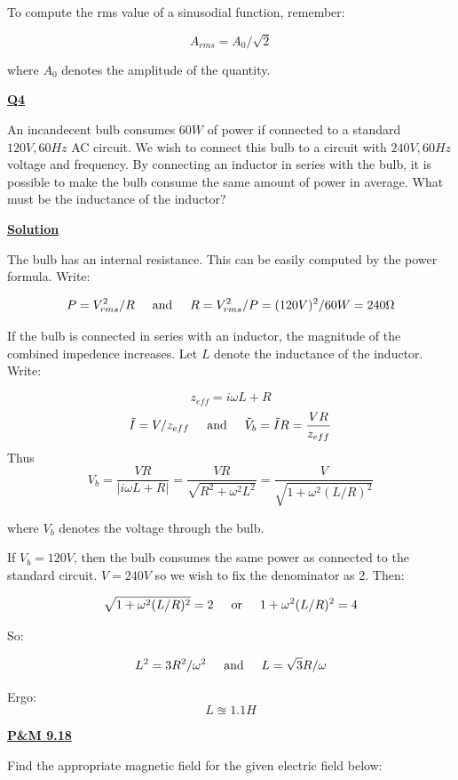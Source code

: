\documentclass{article}
\newcommand{\new}[1]{
    \vspace{2mm}
    \noindent
    \textbf{
    \underline{#1}}
}
\newcommand{\textOr}{
    {
        \hspace{5mm}
        \textrm{or}
        \hspace{5mm}
    }
}
\newcommand{\textAnd}{
    {
        \hspace{5mm}
        \textrm{and}
        \hspace{5mm}
    }
}
\def\Ohm{{\Omega}}
\begin{document}
To compute the rms value of a sinusodial function, remember:

\[
    A_{rms} = A_0/\sqrt{2}
\]

where $A_0$ denotes the amplitude of the quantity. 

\new{Q4}
An incandecent bulb consumes $60W$ of power if connected to 
a standard $120V, 60Hz$ AC circuit. We wish to connect this 
bulb to a circuit with $240V, 60Hz$ voltage and frequency. 
By connecting an inductor in series with the bulb, it is possible 
to make the bulb consume the same amount of power in average. 
What must be the inductance of the inductor?

\new{Solution}
The bulb has an internal resistance. This can be easily computed 
by the power formula. Write:

\[
    P = V_{rms}^2/R 
    \textAnd 
    R = V_{rms}^2/P = (120V)^2/60W = 240\Ohm
\]

If the bulb is connected in series with an inductor, the 
magnitude of the combined impedence increases. Let 
$L$ denote the inductance of the inductor. Write:

\[
    z_{eff} = i\omega L + R
\]
\[
    \tilde{I} = V/z_{eff} \textAnd \tilde{V}_b = \tilde{I}R = \frac{VR}{z_{eff}}
\]
Thus
\[
    V_b = \frac{VR}
    {|i\omega L + R|}
    = 
    \frac{VR}
    {\sqrt{R^2+\omega^2L^2}}
    = 
    \frac{V}
    {\sqrt{1+\omega^2 (L/R)^2}}
\]

where $V_b$ denotes the voltage through the bulb. 

If $V_b = 120V$, then the bulb consumes the same power as 
connected to the standard circuit. $V = 240V$ so we wish 
to fix the denominator as 2. Then:

\[
\sqrt{1+\omega^2 (L/R)^2} = 2
\textOr 
1+\omega^2(L/R)^2 = 4
\]

So:

\[
    L^2 = 3R^2/\omega^2 
    \textAnd 
    L = \sqrt{3}R/\omega
\]

Ergo:
\[
    \boxed{
        L \approxeq 1.1H
    }
\]  

\newpage


\newcommand{\hx}{\hat{x}}

\newcommand{\hy}{\hat{y}}

\newcommand{\hz}{\hat{z}}

\newcommand{\hi}{\hat{i}}

\newcommand{\hj}{\hat{j}}

\new{P\&M 9.18}

Find the appropriate magnetic field 
for the given electric field below:
\end{document}
